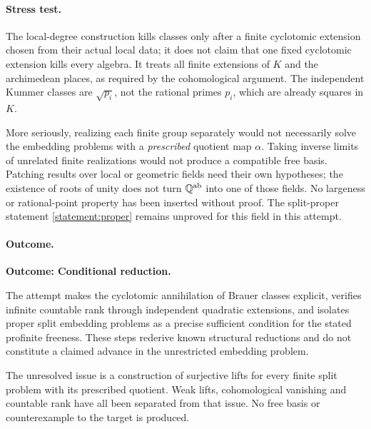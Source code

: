 \documentclass[11pt,a4paper]{article}
\newcommand{\Q}{\mathbb{Q}}
\numberwithin{equation}{section}
\begin{document}
\paragraph{Stress test.}
The local-degree construction kills classes only after a finite
cyclotomic extension chosen from their actual local data; it does not
claim that one fixed cyclotomic extension kills every algebra. It treats
all finite extensions of $K$ and the archimedean places, as required by
the cohomological argument. The independent Kummer classes are
$\sqrt{p_i}$, not the rational primes $p_i$, which are already squares
in $K$.

More seriously, realizing each finite group separately would not
necessarily solve the embedding problems with a \emph{prescribed}
quotient map $\alpha$. Taking inverse limits of unrelated finite
realizations would not produce a compatible free basis. Patching
results over local or geometric fields need their own hypotheses; the
existence of roots of unity does not turn $\Q^{\rm ab}$ into one of
those fields. No largeness or rational-point property has been inserted
without proof. The split-proper statement \eqref{statement:proper} remains
unproved for this field in this attempt.

\paragraph{Outcome.}
\textbf{Outcome: Conditional reduction.}

The attempt makes the cyclotomic annihilation of Brauer classes explicit,
verifies infinite countable rank through independent quadratic
extensions, and isolates proper split embedding problems as a precise
sufficient condition for the stated profinite freeness. These steps
rederive known structural reductions and do not constitute a claimed
advance in the unrestricted embedding problem.

The unresolved issue is a construction of surjective lifts for every
finite split problem with its prescribed quotient. Weak lifts,
cohomological vanishing and countable rank have all been separated from
that issue. No free basis or counterexample to the target is produced.
\end{document}
